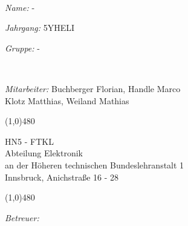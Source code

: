 \documentclass[12pt, a4paper]{article}
\begin{document}
\def \Titel 			{Monitorsteuerung}
\def \Name				{-}
\def \NameMitarbeiter	{Buchberger Florian, Handle Marco\\\hspace{2.6cm} Klotz Matthias, Weiland Mathias}
\def \Betreuer			{Stecher}
\def \Ausgefuehrt		{2013 / 2014}
\def \Abgegeben			{04. 04. 14}
\def \Jahrgang			{5YHELI}
\def \Gruppe			{-}



\begin{titlepage}
~\\[0.5cm]
\begin{minipage}{0.4\textwidth}
\begin{flushleft} \large

\emph{Name:} \Name
\end{flushleft}
\end{minipage}
\begin{minipage}{0.3\textwidth}
\begin{center}\large
\emph{Jahrgang:} \Jahrgang
\end{center}
\end{minipage}
\hspace{0.5cm}
\begin{minipage}{0.2\textwidth}
\begin{flushright} \large
\emph{Gruppe:} \Gruppe
\end{flushright}
\end{minipage}
~\\[0.6cm]
\begin{minipage}{0.8\textwidth}
\begin{flushleft} \large
\emph{Mitarbeiter:} \NameMitarbeiter
\end{flushleft}
\end{minipage}
\begin{center}
\line(1,0){480}
\end{center}
\begin{center}
\textsc{\LARGE HN5 - FTKL}\\
\large Abteilung Elektronik\\[1cm]
an der H\"oheren technischen Bundeslehranstalt 1\\
Innsbruck, Anichstraße 16 - 28
\end{center}
\begin{center}
\line(1,0){480}
\end{center}
\begin{minipage}{0.2\textwidth}
\begin{flushleft} \large
\emph{Betreuer:}\\

\end{flushleft}
\end{minipage}
\end{titlepage}
\end{document}
